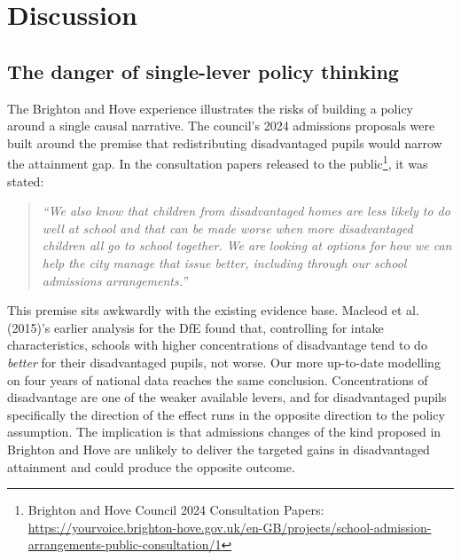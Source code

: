 \documentclass[
  12pt,
  titlepage]{article}
\begin{document}
\section{Discussion}\label{discussion}

\subsection{The danger of single-lever policy
thinking}\label{the-danger-of-single-lever-policy-thinking}

The Brighton and Hove experience illustrates the risks of building a
policy around a single causal narrative. The council's 2024 admissions
proposals were built around the premise that redistributing
disadvantaged pupils would narrow the attainment gap. In the
consultation papers released to the public\footnote{Brighton and Hove
  Council 2024 Consultation Papers:
  \url{https://yourvoice.brighton-hove.gov.uk/en-GB/projects/school-admission-arrangements-public-consultation/1}},
it was stated:

\begin{quote}
\emph{``We also know that children from disadvantaged homes are less
likely to do well at school and that can be made worse when more
disadvantaged children all go to school together. We are looking at
options for how we can help the city manage that issue better, including
through our school admissions arrangements.''}
\end{quote}

This premise sits awkwardly with the existing evidence base. Macleod et
al. (2015)'s earlier analysis for the DfE found that, controlling for
intake characteristics, schools with higher concentrations of
disadvantage tend to do \emph{better} for their disadvantaged pupils,
not worse. Our more up-to-date modelling on four years of national data
reaches the same conclusion. Concentrations of disadvantage are one of
the weaker available levers, and for disadvantaged pupils specifically
the direction of the effect runs in the opposite direction to the policy
assumption. The implication is that admissions changes of the kind
proposed in Brighton and Hove are unlikely to deliver the targeted gains
in disadvantaged attainment and could produce the opposite outcome.
\end{document}
